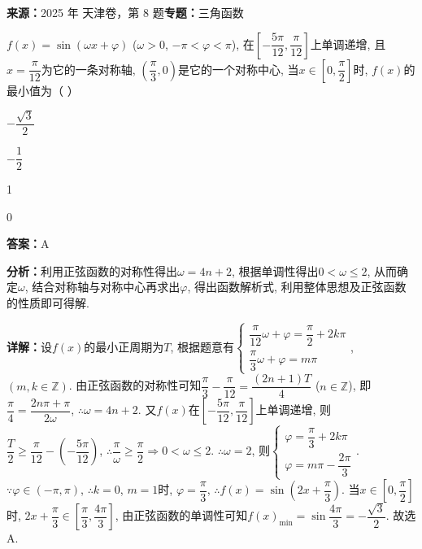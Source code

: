 \begin{question}[points=5]
\textbf{来源：}2025 年 天津卷，第 8 题\quad \textbf{专题：}三角函数\par
$f(x) = \sin(\omega x + \varphi)$ ($\omega > 0$, $-\pi < \varphi < \pi$), 在$\left[-\dfrac{5\pi}{12}, \dfrac{\pi}{12}\right]$上单调递增, 且$x = \dfrac{\pi}{12}$为它的一条对称轴, $\left(\dfrac{\pi}{3}, 0\right)$是它的一个对称中心, 当$x \in \left[0, \dfrac{\pi}{2}\right]$时, $f(x)$的最小值为（   ）
\begin{choices}
  \item $-\dfrac{\sqrt{3}}{2}$
  \item $-\dfrac{1}{2}$
  \item 1
  \item 0
\end{choices}
\begin{solution}
\textbf{答案：}A

\textbf{分析：}利用正弦函数的对称性得出$\omega = 4n + 2$, 根据单调性得出$0 < \omega \le 2$, 从而确定$\omega$, 结合对称轴与对称中心再求出$\varphi$, 得出函数解析式, 利用整体思想及正弦函数的性质即可得解.

\textbf{详解：}设$f(x)$的最小正周期为$T$, 根据题意有$\begin{cases} \dfrac{\pi}{12}\omega + \varphi = \dfrac{\pi}{2} + 2k\pi \\ \dfrac{\pi}{3}\omega + \varphi = m\pi \end{cases}$, $(m, k \in \mathbb{Z})$. 由正弦函数的对称性可知$\dfrac{\pi}{3} - \dfrac{\pi}{12} = \dfrac{(2n+1)T}{4}$ ($n \in \mathbb{Z}$), 即$\dfrac{\pi}{4} = \dfrac{2n\pi + \pi}{2\omega}$, $\therefore \omega = 4n + 2$. 又$f(x)$在$\left[-\dfrac{5\pi}{12}, \dfrac{\pi}{12}\right]$上单调递增, 则$\dfrac{T}{2} \ge \dfrac{\pi}{12} - \left(-\dfrac{5\pi}{12}\right)$, $\therefore \dfrac{\pi}{\omega} \ge \dfrac{\pi}{2} \Rightarrow 0 < \omega \le 2$. $\therefore \omega = 2$, 则$\begin{cases} \varphi = \dfrac{\pi}{3} + 2k\pi \\ \varphi = m\pi - \dfrac{2\pi}{3} \end{cases}$. $\because \varphi \in (-\pi, \pi)$, $\therefore k=0$, $m=1$时, $\varphi = \dfrac{\pi}{3}$, $\therefore f(x) = \sin\left(2x + \dfrac{\pi}{3}\right)$. 当$x \in \left[0, \dfrac{\pi}{2}\right]$时, $2x + \dfrac{\pi}{3} \in \left[\dfrac{\pi}{3}, \dfrac{4\pi}{3}\right]$, 由正弦函数的单调性可知$f(x)_{\min} = \sin\dfrac{4\pi}{3} = -\dfrac{\sqrt{3}}{2}$. 故选A.
\end{solution}
\end{question}


